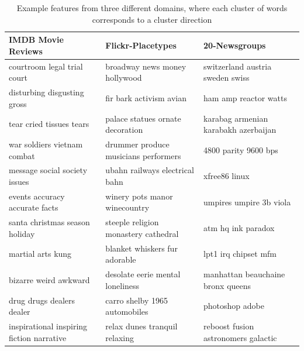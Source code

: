  \begin{table}[] 
 	\scriptsize
 	\begin{tabular}{lll}                                                                   
 		\textbf{IMDB Movie Reviews}                                 & \textbf{Flickr-Placetypes}           & \textbf{20-Newsgroups}                           \\
 		\toprule[\heavyrulewidth]
 		courtroom legal trial court                                 & broadway news money hollywood        & switzerland austria sweden swiss     \\
 		disturbing disgusting gross                                 & fir bark activism avian              & ham amp reactor watts                \\
 		tear cried tissues tears                                    & palace statues ornate decoration     & karabag armenian karabakh azerbaijan \\
 		war soldiers vietnam combat                                 & drummer produce musicians performers & 4800 parity 9600 bps                 \\
 		message social society issues                               & ubahn railways electrical bahn       & xfree86 linux                        \\
 		events accuracy accurate facts                              & winery pots manor winecountry        & umpires umpire 3b viola              \\
 		santa christmas season holiday                              & steeple religion monastery cathedral & atm hq ink paradox                   \\
 		martial arts kung                                           & blanket whiskers fur adorable        & lpt1 irq chipset mfm                 \\
 		bizarre weird awkward                                       & desolate eerie mental loneliness     & manhattan beauchaine bronx queens    \\
 		drug drugs dealers dealer                                   & carro shelby 1965 automobiles        & photoshop adobe                      \\
 		inspirational inspiring fiction narrative                   & relax dunes tranquil relaxing        & reboost fusion astronomers galactic 
 	\end{tabular}  
 	\caption{Example features from three different domains, where each cluster of words corresponds to a cluster direction}\label{ch3:ExampleRep}    
 \end{table} 



